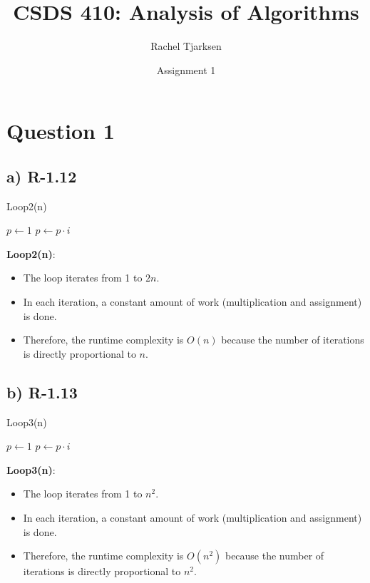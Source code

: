 \documentclass[12pt, letterpaper]{article}
\title{CSDS 410: Analysis of Algorithms}
\author{Rachel Tjarksen}
\date{Assignment 1}
\begin{document}
\maketitle

\tableofcontents

\newpage

\section{Question 1}
\subsection{a) R-1.12}
\begin{algorithm}
\caption{Loop2(n)}
\begin{algorithmic}[Hhtbp]
\State $p \gets 1$ 
 
    \State $p \gets p \cdot i$ 
\EndFor
\end{algorithmic}
\end{algorithm}
\textbf{Loop2(n)}:
\begin{itemize}
    \item The loop iterates from 1 to \(2n\).
    \item  In each iteration, a constant amount of work (multiplication and assignment) is done.
    \item Therefore, the runtime complexity is \(O(n)\) because the number of iterations is directly proportional to \(n\).
\end{itemize}

\subsection{b) R-1.13}
\begin{algorithm}
\caption{Loop3(n)}
\begin{algorithmic}[Hhtbp]
\State $p \gets 1$ 
    \State $p \gets p \cdot i$
\EndFor
\end{algorithmic}
\end{algorithm}
\textbf{Loop3(n)}:
\begin{itemize}
    \item The loop iterates from 1 to \(n^2\).
    \item In each iteration, a constant amount of work (multiplication and assignment) is done.
   \item Therefore, the runtime complexity is \(O(n^2)\) because the number of iterations is directly proportional to \(n^2\).
\end{itemize}
\end{document}
